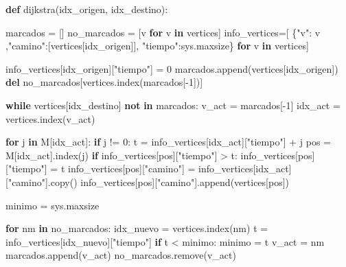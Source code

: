 \documentclass[
]{article}
\newenvironment{Shaded}{}{}
\newcommand{\ControlFlowTok}[1]{\textcolor[rgb]{0.00,0.44,0.13}{\textbf{#1}}}
\newcommand{\DecValTok}[1]{\textcolor[rgb]{0.25,0.63,0.44}{#1}}
\newcommand{\KeywordTok}[1]{\textcolor[rgb]{0.00,0.44,0.13}{\textbf{#1}}}
\newcommand{\NormalTok}[1]{#1}
\newcommand{\OperatorTok}[1]{\textcolor[rgb]{0.40,0.40,0.40}{#1}}
\newcommand{\StringTok}[1]{\textcolor[rgb]{0.25,0.44,0.63}{#1}}
\begin{document}
\begin{Shaded}
\begin{Highlighting}[]
\KeywordTok{def}\NormalTok{ dijkstra(idx\_origen, idx\_destino):}
  
\NormalTok{  marcados }\OperatorTok{=}\NormalTok{ []}
\NormalTok{  no\_marcados }\OperatorTok{=}\NormalTok{ [v }\ControlFlowTok{for}\NormalTok{ v }\KeywordTok{in}\NormalTok{ vertices]}
\NormalTok{  info\_vertices}\OperatorTok{=}\NormalTok{[ \{}\StringTok{"v"}\NormalTok{: v ,}\StringTok{"camino"}\NormalTok{:[vertices[idx\_origen]], }\StringTok{"tiempo"}\NormalTok{:sys.maxsize\} }\ControlFlowTok{for}\NormalTok{ v }\KeywordTok{in}\NormalTok{ vertices]}
  
\NormalTok{  info\_vertices[idx\_origen][}\StringTok{"tiempo"}\NormalTok{] }\OperatorTok{=} \DecValTok{0}
\NormalTok{  marcados.append(vertices[idx\_origen])}
  \KeywordTok{del}\NormalTok{ no\_marcados[vertices.index(marcados[}\OperatorTok{{-}}\DecValTok{1}\NormalTok{])]}

  \ControlFlowTok{while}\NormalTok{ vertices[idx\_destino] }\KeywordTok{not} \KeywordTok{in}\NormalTok{ marcados:}
\NormalTok{    v\_act }\OperatorTok{=}\NormalTok{ marcados[}\OperatorTok{{-}}\DecValTok{1}\NormalTok{]}
\NormalTok{    idx\_act }\OperatorTok{=}\NormalTok{ vertices.index(v\_act)}
  
    \ControlFlowTok{for}\NormalTok{ j }\KeywordTok{in}\NormalTok{ M[idx\_act]:}
      \ControlFlowTok{if}\NormalTok{ j }\OperatorTok{!=} \DecValTok{0}\NormalTok{:}
\NormalTok{        t }\OperatorTok{=}\NormalTok{ info\_vertices[idx\_act][}\StringTok{"tiempo"}\NormalTok{] }\OperatorTok{+}\NormalTok{ j}
\NormalTok{        pos }\OperatorTok{=}\NormalTok{ M[idx\_act].index(j)}
        \ControlFlowTok{if}\NormalTok{ info\_vertices[pos][}\StringTok{"tiempo"}\NormalTok{] }\OperatorTok{\textgreater{}}\NormalTok{ t:}
\NormalTok{          info\_vertices[pos][}\StringTok{"tiempo"}\NormalTok{] }\OperatorTok{=}\NormalTok{ t}
\NormalTok{          info\_vertices[pos][}\StringTok{"camino"}\NormalTok{] }\OperatorTok{=}\NormalTok{ info\_vertices[idx\_act][}\StringTok{"camino"}\NormalTok{].copy()}
\NormalTok{          info\_vertices[pos][}\StringTok{"camino"}\NormalTok{].append(vertices[pos])}

\NormalTok{    minimo }\OperatorTok{=}\NormalTok{ sys.maxsize}

    \ControlFlowTok{for}\NormalTok{ nm }\KeywordTok{in}\NormalTok{ no\_marcados:}
\NormalTok{      idx\_nuevo }\OperatorTok{=}\NormalTok{ vertices.index(nm)}
\NormalTok{      t }\OperatorTok{=}\NormalTok{ info\_vertices[idx\_nuevo][}\StringTok{"tiempo"}\NormalTok{]}
      \ControlFlowTok{if}\NormalTok{ t }\OperatorTok{\textless{}}\NormalTok{ minimo:}
\NormalTok{        minimo }\OperatorTok{=}\NormalTok{ t}
\NormalTok{        v\_act }\OperatorTok{=}\NormalTok{ nm}
\NormalTok{    marcados.append(v\_act)}
\NormalTok{    no\_marcados.remove(v\_act)   }


\end{Highlighting}
\end{Shaded}
\end{document}
